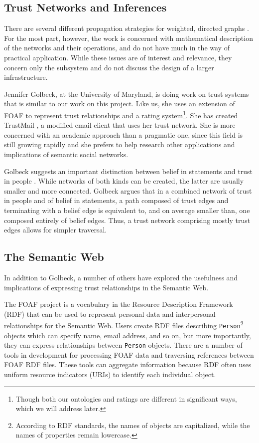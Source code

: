 \documentclass[letterpaper]{www2006-submission}
\begin{document}
\subsection{Trust Networks and Inferences}
There are several different propagation strategies for weighted, directed graphs \citep{richardson03management} \citep{abdul-rahman:relying} \citep{guha04propagation}.  For the most part, however, the work is concerned with mathematical description of the networks and their operations, and do not have much in the way of practical application.  While these issues are of interest and relevance, they concern only the subsystem and do not discuss the design of a larger infrastructure.

Jennifer Golbeck, at the University of Maryland, is doing work on trust systems  \citep{golbeckDissertation} that is similar to our work on this project.  Like us, she uses an extension of FOAF to represent trust relationships and a rating system\footnote{Though both our ontologies and ratings are different in significant ways, which we will address later.}.  She has created TrustMail  \citep{trustMail}, a modified email client that uses her trust network.  She is more concerned with an academic approach than a pragmatic one, since this field is still growing rapidly and she prefers to help research other applications and implications of semantic social networks.

Golbeck suggests an important distinction between belief in statements and trust in people \citep{golbeck:accuracy}.  While networks of both kinds can be created, the latter are usually smaller and more connected.  Golbeck argues that in a combined network of trust in people and of belief in statements, a path composed of trust edges and terminating with a belief edge is equivalent to, and on average smaller than, one composed entirely of belief edges.  Thus, a trust network comprising mostly trust edges allows for simpler traversal.

\subsection{The Semantic Web}
In addition to Golbeck, a number of others have explored the usefulness and implications of expressing trust relationships in the Semantic Web.

\label{foaf}
The FOAF project \citep{foafProject} is a vocabulary in the Resource Description Framework (RDF) that can be used to represent personal data and interpersonal relationships for the Semantic Web.  Users create RDF files describing \texttt{Person}\footnote{According to RDF standards, the names of objects are capitalized, while the names of properties remain lowercase.} objects which can specify name, email address, and so on, but more importantly, they can express relationships between \texttt{Person} objects.  There are a number of tools in development for processing FOAF data and traversing references between FOAF RDF files.  These tools can aggregate information because RDF often uses uniform resource indicators (URIs) to identify each individual object.
\end{document}
